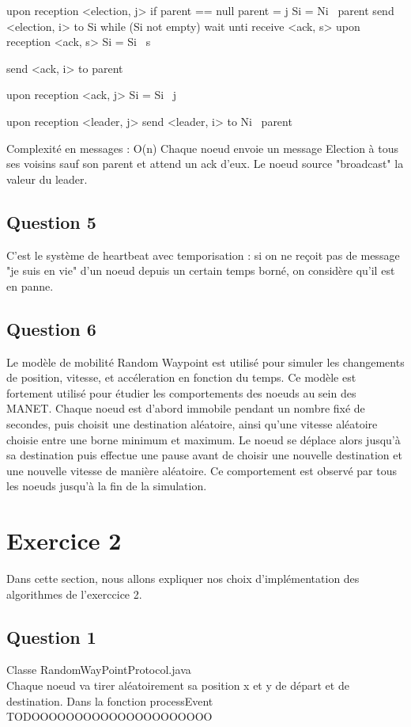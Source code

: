 \documentclass[paper=a4, fontsize=11pt]{article} %
\begin{document}
upon reception <election, j>
	if parent == null
		parent = j
		Si = Ni \ parent
		send <election, i> to Si
		while (Si not empty)
			wait unti receive <ack, s>
			upon reception <ack, s>
			Si = Si \ s

	send <ack, i> to parent
			

upon reception <ack, j>
	Si = Si \ j

upon reception <leader, j>
	send <leader, i> to Ni \ parent


Complexité en messages : O(n)
Chaque noeud envoie un message Election à tous ses voisins sauf son parent et attend un ack d'eux.
Le noeud source "broadcast" la valeur du leader.

 
\subsection{Question 5}
C'est le système de heartbeat avec temporisation : si on ne reçoit pas de message "je suis en vie" d'un noeud depuis un certain temps borné, on considère qu'il est en panne. 

\subsection{Question 6}

Le modèle de mobilité Random Waypoint est utilisé pour simuler les changements de position, vitesse, et accéleration en fonction du temps. Ce modèle est fortement utilisé
pour étudier les comportements des noeuds au sein des MANET. Chaque noeud est d'abord immobile pendant un nombre fixé de secondes, puis choisit une destination aléatoire, ainsi qu'une vitesse aléatoire choisie entre une borne
minimum et maximum. Le noeud se déplace alors jusqu'à sa destination puis effectue une pause avant de choisir une nouvelle destination et une nouvelle vitesse de manière aléatoire. Ce comportement est observé par tous les noeuds jusqu'à 
la fin de la simulation.

\section{Exercice 2}
Dans cette section, nous allons expliquer nos choix d'implémentation des algorithmes de l'exerccice 2.

\subsection{Question 1}
Classe RandomWayPointProtocol.java \\
Chaque noeud va tirer aléatoirement sa position x et y de départ et de destination. 
Dans la fonction processEvent TODOOOOOOOOOOOOOOOOOOOOO
\end{document}
